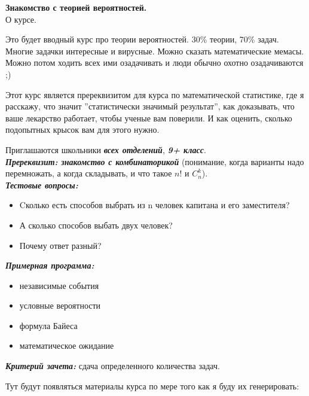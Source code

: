 \documentclass[11pt,a4paper]{article}
\renewcommand{\!}{\textcolor{red}{!}}
\newcommand{\EMPH}[1]{{\large \textit{\textbf{#1}}}}
\begin{document}
\pagestyle{empty}

\begin{center}
	\large
	\textbf{Знакомство с теорией вероятностей.}\\
	\normalsize
	О курсе.
\end{center}


Это будет вводный курс про теории вероятностей. 30\% теории, 70\% задач. Многие задачки интересные и вирусные. Можно сказать математические мемасы. Можно потом ходить всех ими озадачивать и люди обычно охотно озадачиваются ;)

Этот курс является пререквизитом для курса по математической статистике, где я расскажу, что значит ''статистически значимый результат'', как доказывать, что ваше лекарство работает, чтобы ученые вам поверили. И как оценить, сколько подопытных крысок вам для этого нужно.

\vspace{1cm}
Приглашаются школьники \EMPH{всех отделений}, \EMPH{9+ класс}.\\
\EMPH{Пререквизит: знакомство с комбинаторикой} (понимание, когда варианты надо перемножать, а когда складывать, и что такое $n!$ и $C_n^k$).\\
\EMPH{Тестовые вопросы:}
\begin{itemize}
	\setlength\itemsep{0em}
	\item Cколько есть способов выбрать из n человек капитана и его заместителя?
	\item А сколько способов выбать двух человек?
	\item Почему ответ разный?
\end{itemize}
\EMPH{Примерная программа:}
\begin{itemize}
	\setlength\itemsep{0em}
	\item независимые события
	\item условные вероятности
	\item формула Байеса
	\item математическое ожидание
\end{itemize}
\EMPH{Критерий зачета:} сдача определенного количества задач.

Тут будут появляться материалы курса по мере того как я буду их генерировать:
\end{document}
